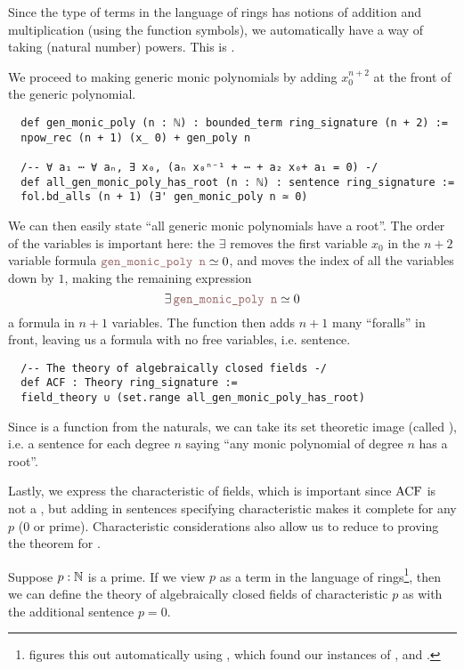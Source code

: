 \begin{dfn}
  Since the type of terms in the language of rings has notions of
  addition and multiplication (using the function symbols),
  we automatically have a way of taking (natural number) powers.
  This is .

  We proceed to making generic monic polynomials by adding
  $x_{0}^{n+2}$ at the front of the generic polynomial.

  \begin{lstlisting}
  def gen_monic_poly (n : ℕ) : bounded_term ring_signature (n + 2) :=
  npow_rec (n + 1) (x_ 0) + gen_poly n

  /-- ∀ a₁ ⋯ ∀ aₙ, ∃ x₀, (aₙ x₀ⁿ⁻¹ + ⋯ + a₂ x₀+ a₁ = 0) -/
  def all_gen_monic_poly_has_root (n : ℕ) : sentence ring_signature :=
  fol.bd_alls (n + 1) (∃' gen_monic_poly n ≃ 0) \end{lstlisting}

  We can then easily state ``all generic monic polynomials have a root''.
  The order of the variables is important here:
  the $\exists$ removes the first variable $x_{0}$ in the $n+2$ variable formula
  $\code{gen\_monic\_poly n} \simeq 0$, and moves the index of all the
  variables down by $1$, making the remaining expression
  \[\exists \, \code{gen\_monic\_poly n} \simeq 0\] a formula in $n+1$ variables.
  The function  then adds $n+1$ many ``foralls''
  in front, leaving us a formula with no free variables, i.e. sentence.

  \begin{lstlisting}
  /-- The theory of algebraically closed fields -/
  def ACF : Theory ring_signature :=
  field_theory ∪ (set.range all_gen_monic_poly_has_root)\end{lstlisting}

  Since  is a function from the naturals,
  we can take its set theoretic image (called ),
  i.e. a sentence for each degree $n$ saying
  ``any monic polynomial of degree $n$ has a root''.

  Lastly, we express the characteristic of fields,
  which is important since $\operatorname{ACF}$ is not a ,
  but adding in sentences specifying characteristic makes it complete for any $p$ ($0$ or prime).
  Characteristic considerations also allow us to reduce to proving the theorem for
  .

  Suppose $p : \mathbb{N}$ is a prime.
  If we view $p$ as a term in the language of rings\footnote{
     figures this out automatically using ,
    which found our instances of , 
    and .
  },
  then we can define the theory of algebraically closed fields of characteristic $p$
  as  with the additional sentence $p = 0$.


\end{dfn}
